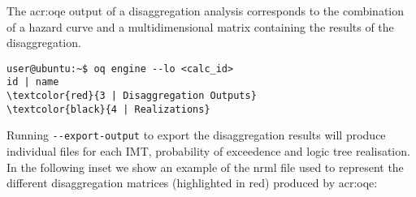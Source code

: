 The \glsdesc{acr:oqe} output of a disaggregation analysis corresponds to the
combination of a hazard curve and a multidimensional matrix containing the
results of the disaggregation.

\begin{Verbatim}[frame=single, commandchars=\\\{\}, fontsize=\small]
user@ubuntu:~$ oq engine --lo <calc_id>
id | name
\textcolor{red}{3 | Disaggregation Outputs}
\textcolor{black}{4 | Realizations}
\end{Verbatim}
%

Running \texttt{-{}-export-output} to export the disaggregation results will produce individual files for each IMT, probability of exceedence and logic tree realisation. In the following inset we show an example of the nrml file used to represent the different disaggregation matrices (highlighted in red) produced by
\gls{acr:oqe}:

